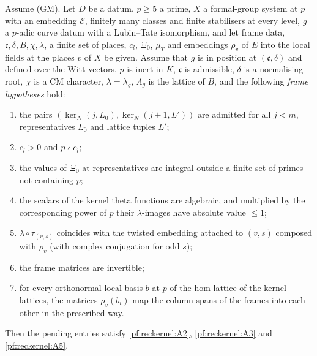 \begin{theorem}\label{pf:reckernel:firstLaw}
Assume \textup{(GM)}. Let $D$ be a datum, $p\ge5$ a prime, $X$ a formal-group system at $p$ with an embedding $\mathcal E$, finitely
many classes and finite stabilisers at every level, $g$ a $p$-adic curve datum with a Lubin--Tate isomorphism, and let
frame data, $\mathfrak c,\delta,B,\chi,\lambda$, a finite set of places, $c_l$, $\Xi_0$, $\mu_T$ and embeddings $\rho_v$ of
$E$ into the local fields at the places $v$ of $X$ be given. Assume that $g$ is in position at $(\mathfrak c,\delta)$ and
defined over the Witt vectors, $p$ is inert in $K$, $\mathfrak c$ is admissible, $\delta$ is a normalising root, $\chi$ is a
CM character, $\lambda=\lambda_g$, $\Lambda_g$ is the lattice of $B$, and the following \emph{frame hypotheses} hold:
\begin{enumerate}[label=(\roman*)]
\item the pairs $(\ker_N(j,L_0),\ker_N(j+1,L'))$ are admitted for all $j<m$, representatives $L_0$ and lattice tuples $L'$;
\item $c_l>0$ and $p\nmid c_l$;
\item the values of $\Xi_0$ at representatives are integral outside a finite set of primes not containing $p$;
\item the scalars of the kernel theta functions are algebraic, and multiplied by the corresponding power of $p$ their
  $\lambda$-images have absolute value $\le1$;
\item $\lambda\circ\tau_{(v,s)}$ coincides with the twisted embedding attached to $(v,s)$ composed with $\rho_v$ (with complex
  conjugation for odd $s$);
\item the frame matrices are invertible;
\item for every orthonormal local basis $b$ at $p$ of the hom-lattice of the kernel lattices, the matrices $\rho_v(b_i)$ map
  the column spans of the frames into each other in the prescribed way.
\end{enumerate}
Then the pending entries satisfy \ref{pf:reckernel:A2}, \ref{pf:reckernel:A3} and \ref{pf:reckernel:A5}.
\end{theorem}

